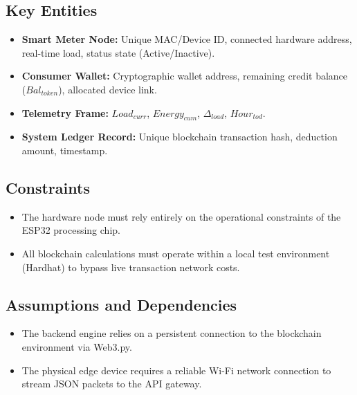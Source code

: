 \subsection{Key Entities}
\begin{itemize}[leftmargin=*]
  \item \textbf{Smart Meter Node:} Unique MAC/Device ID, connected hardware address, real-time load, status state (Active/Inactive).
  \item \textbf{Consumer Wallet:} Cryptographic wallet address, remaining credit balance ($Bal_{token}$), allocated device link.
  \item \textbf{Telemetry Frame:} $Load_{curr}$, $Energy_{cum}$, $\Delta_{load}$, $Hour_{tod}$.
  \item \textbf{System Ledger Record:} Unique blockchain transaction hash, deduction amount, timestamp.
\end{itemize}

\subsection{Constraints}
\begin{itemize}[leftmargin=*]
  \item The hardware node must rely entirely on the operational constraints of the ESP32 processing chip.
  \item All blockchain calculations must operate within a local test environment (Hardhat) to bypass live transaction network costs.
\end{itemize}

\subsection{Assumptions and Dependencies}
\begin{itemize}[leftmargin=*]
  \item The backend engine relies on a persistent connection to the blockchain environment via Web3.py.
  \item The physical edge device requires a reliable Wi-Fi network connection to stream JSON packets to the API gateway.
\end{itemize}

